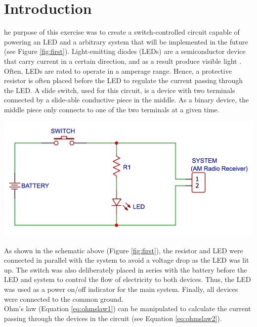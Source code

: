 \documentclass[journal]{IEEEtran}
\begin{document}
\section{Introduction}
\lowercase{he} purpose of this exercise was to create a switch-controlled circuit capable of powering an LED and a arbitrary system that will be implemented in the future (see Figure \ref{fig:first}). Light-emitting diodes (LEDs) are a semiconductor device that carry current in a certain direction, and as a result produce visible light \cite[]{hayt1986engineering}. Often, LEDs are rated to operate in a amperage range. Hence, a protective resistor is often placed before the LED to regulate the current passing through the LED. A slide switch, used for this circuit, is a device with two terminals connected by a slide-able conductive piece in the middle. As a binary device, the middle piece only connects to one of the two terminals at a given time.

\begingroup
    \medskip
    \centering
    \includegraphics[width=\columnwidth]{images/lab2_1.png}
    \label{fig:first}
    \medskip
\endgroup

\noindent As shown in the schematic above (Figure \ref{fig:first}), the resistor and LED were connected in parallel with the system to avoid a voltage drop as the LED was lit up. The switch was also deliberately placed in series with the battery before the LED and system to control the flow of electricity to both devices. Thus, the LED was used as a power on/off indicator for the main system. Finally, all devices were connected to the common ground.\\

\noindent Ohm's law (Equation \ref{eq:ohmslaw1}) can be manipulated to calculate the current passing through the devices in the circuit (see Equation \ref{eq:ohmslaw2}).
\end{document}
